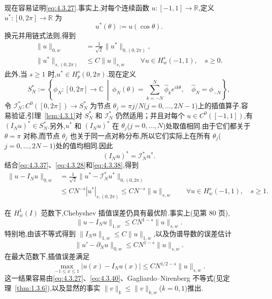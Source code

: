 现在容易证明\eqref{eq:4.3.27}.事实上,对每个连续函数 \(u\colon[-1,1]\to\mathbb R\),定义 \(u^*\colon[0,2\pi]\to\mathbb R\) 为
\begin{equation}\label{eq:4.3.36}
  u^*(\theta):=u(\cos\theta).
\end{equation}
换元并用链式法则,得到
\begin{align}
  \|u\|_{0,w}&=\frac1{\sqrt2}\|u^*\|_{0,(0,2\pi)},\label{eq:4.3.37}\\
  \|u^*\|_{s,(0,2\pi)}&\le C\|u\|_{s,w}
    \qquad\forall u\in H_w^s(-1,1),\quad s\ge0.\label{eq:4.3.38}
\end{align}
此外,当 \(s\ge1\) 时,\(u^*\in H_p^s(0,2\pi)\).现在定义
\[
  S_N^*:=\left\{\phi_N\colon[0,2\pi]\to\mathbb C\ \middle|\
    \phi_N(\theta)=\sum_{k=-N}^N\widehat\phi_k e^{ik\theta},
    \quad\widehat\phi_N=\widehat\phi_{-N}\right\},
\]
令 \(\mathcal I_N^*\colon C^0([0,2\pi])\to S_N^*\) 为节点 \(\theta_j=\pi j/N\)(\(j=0,\ldots,2N-1\))上的插值算子.容易验证,引理~\ref{lem:4.3.1}对 \(S_N^*\) 和 \(\mathcal I_N^*\) 仍然适用；并且对每个 \(u\in C^0([-1,1])\),有 \((I_Nu)^*\in S_N^*\).另外,\(u^*\) 和 \((I_Nu)^*\) 在 \(\theta_j\)(\(j=0,\ldots,N\))处取值相同.由于它们都关于\(\theta=\pi\) 对称,而节点 \(\theta_j\) 也关于同一点对称分布,所以它们实际上在所有 \(\theta_j\)(\(j=0,\ldots,2N-1\))处的值均相同.因此
\begin{equation}\label{eq:4.3.39}
  (I_Nu)^*=\mathcal I_N^*u^*.
\end{equation}
结合\eqref{eq:4.3.37}、\eqref{eq:4.3.28}和\eqref{eq:4.3.38},得到
\[
  \begin{aligned}
    \|u-I_Nu\|_{0,w}
    &=\frac1{\sqrt2}\|u^*-\mathcal I_N^*u^*\|_{0,(0,2\pi)}\\
    &\le CN^{-s}|u^*|_{s,(0,2\pi)}
      \le CN^{-s}\|u\|_{s,w}\qquad\forall u\in H_w^s(-1,1),\quad s\ge1.
  \end{aligned}
\]

在 \(H_w^1(I)\) 范数下,Chebyshev 插值误差仍具有最优阶.事实上(见第 80 页),
\begin{equation}\label{eq:4.3.40}
  \|u-I_Nu\|_{1,w}\le CN^{1-s}\|u\|_{s,w}.
\end{equation}
特别地,由该不等式得到 \(\|I_Nu\|_{1,w}\le C\|u\|_{1,w}\),以及伪谱导数的误差估计
\begin{equation}\label{eq:4.3.41}
  \|u'-\partial_Nu\|_{0,w}\le CN^{1-s}\|u\|_{s,w}.
\end{equation}
在最大范数下,插值误差满足
\begin{equation}\label{eq:4.3.42}
  \max_{-1\le x\le1}|u(x)-I_Nu(x)|\le CN^{1/2-s}\|u\|_{s,w}.
\end{equation}
这一结果容易由\eqref{eq:4.3.27}、\eqref{eq:4.3.40}、Gagliardo--Nirenberg 不等式(见定理~\ref{thm:1.3.6}),以及显然的事实 \(\|v\|_k\le\|v\|_{k,w}\)(\(k=0,1\))推出.


